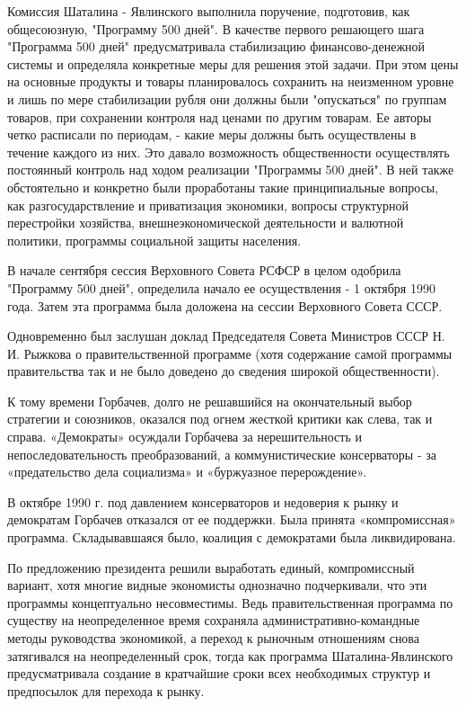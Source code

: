 \documentclass{article}
\begin{document}
\hfill

Комиссия Шаталина - Явлинского выполнила поручение, подготовив, как общесоюзную, "Программу 500 дней". В качестве первого решающего шага "Программа 500 дней" предусматривала стабилизацию финансово-денежной системы и определяла конкретные меры для решения этой задачи. При этом цены на основные продукты и товары планировалось сохранить на неизменном уровне и лишь по мере стабилизации рубля они должны были "опускаться" по группам товаров, при сохранении контроля над ценами по другим товарам. Ее авторы четко расписали по периодам, - какие меры должны быть осуществлены в течение каждого из них. Это давало возможность общественности осуществлять постоянный контроль над ходом реализации "Программы 500 дней". В ней также обстоятельно и конкретно были проработаны такие принципиальные вопросы, как разгосударствление и приватизация экономики, вопросы структурной перестройки хозяйства, внешнеэкономической деятельности и валютной политики, программы социальной защиты населения.

\hfill

В начале сентября сессия Верховного Совета РСФСР в целом одобрила "Программу 500 дней", определила начало ее осуществления - 1 октября 1990 года. Затем эта программа была доложена на сессии Верховного Совета СССР.

\hfill

Одновременно был заслушан доклад Председателя Совета Министров СССР Н. И. Рыжкова о правительственной программе (хотя содержание самой программы правительства так и не было доведено до сведения широкой общественности).

\hfill

К тому времени Горбачев, долго не решавшийся на окончательный выбор стратегии и союзников, оказался под огнем жесткой критики как слева, так и справа. «Демократы» осуждали Горбачева за нерешительность и непоследовательность преобразований, а коммунистические консерваторы - за «предательство дела социализма» и «буржуазное перерождение».

\hfill

В октябре 1990 г. под давлением консерваторов и недоверия к рынку и демократам Горбачев отказался от ее поддержки. Была принята «компромиссная» программа. Складывавшаяся было, коалиция с демократами была ликвидирована.

\hfill

По предложению президента решили выработать единый, компромиссный вариант, хотя многие видные экономисты однозначно подчеркивали, что эти программы концептуально несовместимы. Ведь правительственная программа по существу на неопределенное время сохраняла административно-командные методы руководства экономикой, а переход к рыночным отношениям снова затягивался на неопределенный срок, тогда как программа Шаталина-Явлинского предусматривала создание в кратчайшие сроки всех необходимых структур и предпосылок для перехода к рынку.
\end{document}
